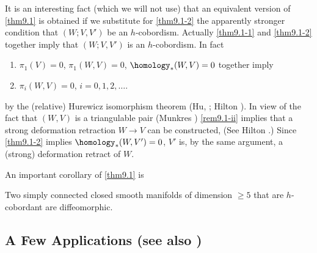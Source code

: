 \begin{remark*}
	It is an interesting fact (which we will not use) that an equivalent version of \cref{thm9.1} is obtained if we substitute
	for \ref{thm9.1-2} the apparently stronger condition that $(W; V, V')$ be an $h$-cobordism. Actually \ref{thm9.1-1} and \ref{thm9.1-2} together imply that $(W; V, V')$ is an $h$-cobordism. In fact
	\begin{enumerate}[label={\upshape{(\roman*)}},leftmargin=1.5cm]
		\item\label{rem9.1-i} $\pi_1(V)=0$, $\pi_1(W,V)=0$, $\homology_*(W,V)=0$ together imply 
		
		\item\label{rem9.1-ii} $\pi_i(W,V)=0$, $i=0,1,2,\dots$.
	\end{enumerate}
by the (relative) Hurewicz isomorphism theorem  (Hu, \cite[p.~l66]{20}; Hilton \cite[p.~103]{21}). In view of the fact that $(W, V)$ is a
triangulable pair (Munkres \cite[p.~101]{5}) \ref{rem9.1-ii} implies that a
strong deformation retraction $W\to V$ can be constructed,
(See Hilton \cite[p.~98, Theorem~1.7]{21}.) Since \ref{thm9.1-2} implies $\homology_*(W, V') =0$,
$V'$ is, by the same argument, a (strong) deformation retract of 
$W$.
\end{remark*}

An important corollary of \cref{thm9.1} is

\begin{theorem}\label{thm9.2}
	Two simply connected closed smooth manifolds of dimension
	$\geq 5$ that are $h$-cobordant are diffeomorphic.
\end{theorem}

\subsection*{A Few Applications (see also \cite{22, 6})}

